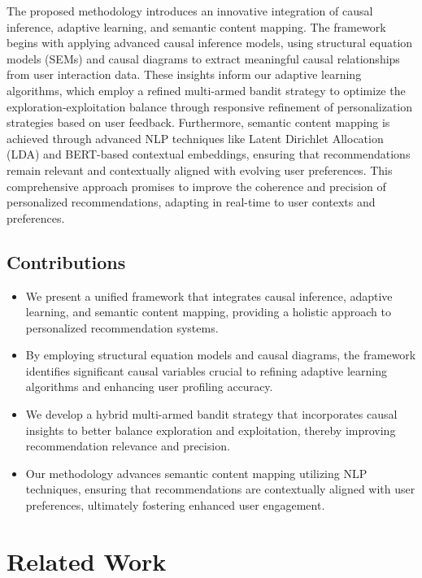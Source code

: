 \documentclass{article} %
\begin{document}
The proposed methodology introduces an innovative integration of causal inference, adaptive learning, and semantic content mapping. The framework begins with applying advanced causal inference models, using structural equation models (SEMs) and causal diagrams to extract meaningful causal relationships from user interaction data. These insights inform our adaptive learning algorithms, which employ a refined multi-armed bandit strategy to optimize the exploration-exploitation balance through responsive refinement of personalization strategies based on user feedback. Furthermore, semantic content mapping is achieved through advanced NLP techniques like Latent Dirichlet Allocation (LDA) and BERT-based contextual embeddings, ensuring that recommendations remain relevant and contextually aligned with evolving user preferences. This comprehensive approach promises to improve the coherence and precision of personalized recommendations, adapting in real-time to user contexts and preferences.

\subsection{Contributions}

\begin{itemize}
    \item We present a unified framework that integrates causal inference, adaptive learning, and semantic content mapping, providing a holistic approach to personalized recommendation systems.
    \item By employing structural equation models and causal diagrams, the framework identifies significant causal variables crucial to refining adaptive learning algorithms and enhancing user profiling accuracy.
    \item We develop a hybrid multi-armed bandit strategy that incorporates causal insights to better balance exploration and exploitation, thereby improving recommendation relevance and precision.
    \item Our methodology advances semantic content mapping utilizing NLP techniques, ensuring that recommendations are contextually aligned with user preferences, ultimately fostering enhanced user engagement.
\end{itemize}



\section{Related Work}
\end{document}
